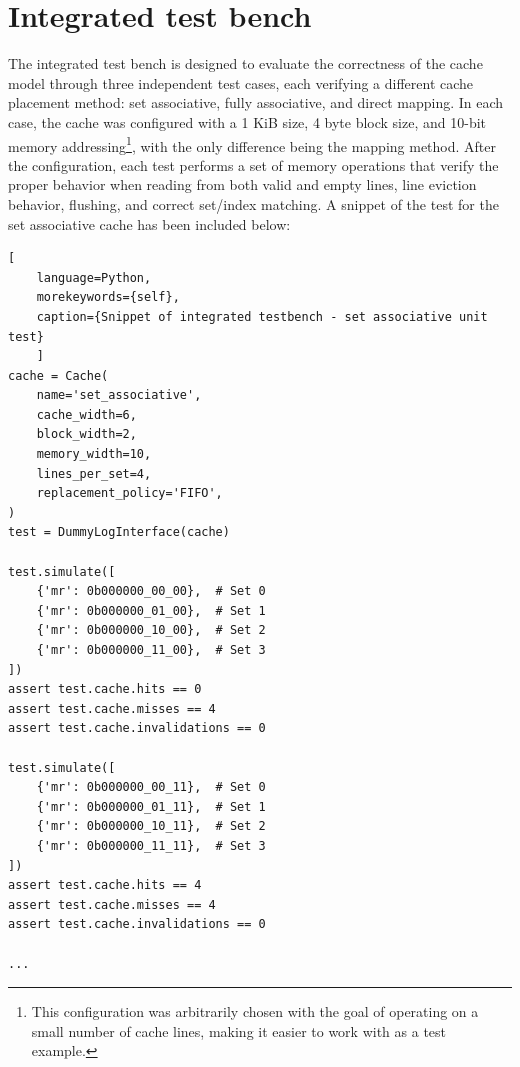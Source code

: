 \section{Integrated test bench}
The integrated test bench is designed to evaluate the correctness of the cache model through three independent test cases, each verifying a different cache placement method:
set associative, fully associative, and direct mapping. In each case, the cache was configured with a 1 KiB size, 4 byte block size, and 10-bit memory addressing\footnote{This
configuration was arbitrarily chosen with the goal of operating on a small number of cache lines, making it easier to work with as a test example.}, with the only difference
being the mapping method. After the configuration, each test performs a set of memory operations that verify the proper behavior when reading from both valid and empty lines, line
eviction behavior, flushing, and correct set/index matching. A snippet of the test for the set associative cache has been included below:

\begin{center}
\centering
\begin{minipage}{\linewidth}
\begin{lstlisting}[
    language=Python,
	morekeywords={self},
    caption={Snippet of integrated testbench - set associative unit test}
    ]
cache = Cache(
    name='set_associative',
    cache_width=6,
    block_width=2,
    memory_width=10,
    lines_per_set=4,
    replacement_policy='FIFO',
)
test = DummyLogInterface(cache)

test.simulate([
    {'mr': 0b000000_00_00},  # Set 0
    {'mr': 0b000000_01_00},  # Set 1
    {'mr': 0b000000_10_00},  # Set 2
    {'mr': 0b000000_11_00},  # Set 3
])
assert test.cache.hits == 0
assert test.cache.misses == 4
assert test.cache.invalidations == 0

test.simulate([
    {'mr': 0b000000_00_11},  # Set 0
    {'mr': 0b000000_01_11},  # Set 1
    {'mr': 0b000000_10_11},  # Set 2
    {'mr': 0b000000_11_11},  # Set 3
])
assert test.cache.hits == 4
assert test.cache.misses == 4
assert test.cache.invalidations == 0

...
\end{lstlisting}
\end{minipage}
\end{center}

